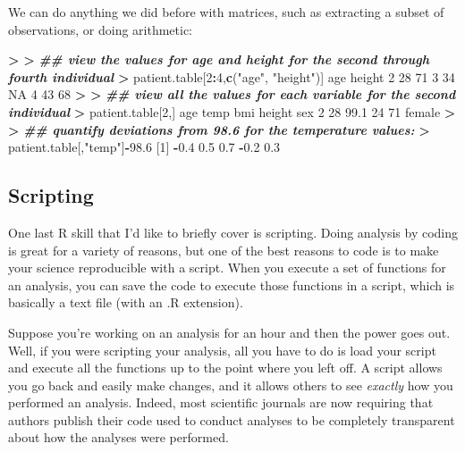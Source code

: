 \documentclass[
]{book}
\newenvironment{Shaded}{\begin{snugshade}}{\end{snugshade}}
\newcommand{\ConstantTok}[1]{\textcolor[rgb]{0.56,0.35,0.01}{#1}}
\newcommand{\DecValTok}[1]{\textcolor[rgb]{0.00,0.00,0.81}{#1}}
\newcommand{\DocumentationTok}[1]{\textcolor[rgb]{0.56,0.35,0.01}{\textbf{\textit{#1}}}}
\newcommand{\ErrorTok}[1]{\textcolor[rgb]{0.64,0.00,0.00}{\textbf{#1}}}
\newcommand{\FloatTok}[1]{\textcolor[rgb]{0.00,0.00,0.81}{#1}}
\newcommand{\FunctionTok}[1]{\textcolor[rgb]{0.13,0.29,0.53}{\textbf{#1}}}
\newcommand{\NormalTok}[1]{#1}
\newcommand{\SpecialCharTok}[1]{\textcolor[rgb]{0.81,0.36,0.00}{\textbf{#1}}}
\newcommand{\StringTok}[1]{\textcolor[rgb]{0.31,0.60,0.02}{#1}}
\begin{document}
We can do anything we did before with matrices, such as extracting a subset of observations, or doing arithmetic:

\begin{Shaded}
\begin{Highlighting}[]
\SpecialCharTok{\textgreater{}} 
\ErrorTok{\textgreater{}} \DocumentationTok{\#\# view the values for age and height for the second through fourth individual}
\ErrorTok{\textgreater{}}\NormalTok{ patient.table[}\DecValTok{2}\SpecialCharTok{:}\DecValTok{4}\NormalTok{,}\FunctionTok{c}\NormalTok{(}\StringTok{"age"}\NormalTok{, }\StringTok{"height"}\NormalTok{)]}
\NormalTok{  age height}
\DecValTok{2}  \DecValTok{28}     \DecValTok{71}
\DecValTok{3}  \DecValTok{34}     \ConstantTok{NA}
\DecValTok{4}  \DecValTok{43}     \DecValTok{68}
\SpecialCharTok{\textgreater{}} 
\ErrorTok{\textgreater{}} \DocumentationTok{\#\# view all the values for each variable for the second individual}
\ErrorTok{\textgreater{}}\NormalTok{ patient.table[}\DecValTok{2}\NormalTok{,]}
\NormalTok{  age temp bmi height    sex}
\DecValTok{2}  \DecValTok{28} \FloatTok{99.1}  \DecValTok{24}     \DecValTok{71}\NormalTok{ female}
\SpecialCharTok{\textgreater{}} 
\ErrorTok{\textgreater{}} \DocumentationTok{\#\# quantify deviations from 98.6 for the temperature values:}
\ErrorTok{\textgreater{}}\NormalTok{ patient.table[,}\StringTok{"temp"}\NormalTok{]}\SpecialCharTok{{-}}\FloatTok{98.6}
\NormalTok{[}\DecValTok{1}\NormalTok{] }\SpecialCharTok{{-}}\FloatTok{0.4}  \FloatTok{0.5}  \FloatTok{0.7} \SpecialCharTok{{-}}\FloatTok{0.2}  \FloatTok{0.3}
\end{Highlighting}
\end{Shaded}

\subsection{Scripting}\label{scripting}

One last R skill that I'd like to briefly cover is scripting. Doing analysis by coding is great for a variety of reasons, but one of the best reasons to code is to make your science reproducible with a script. When you execute a set of functions for an analysis, you can save the code to execute those functions in a script, which is basically a text file (with an .R extension).

Suppose you're working on an analysis for an hour and then the power goes out. Well, if you were scripting your analysis, all you have to do is load your script and execute all the functions up to the point where you left off. A script allows you go back and easily make changes, and it allows others to see \emph{exactly} how you performed an analysis. Indeed, most scientific journals are now requiring that authors publish their code used to conduct analyses to be completely transparent about how the analyses were performed.
\end{document}
